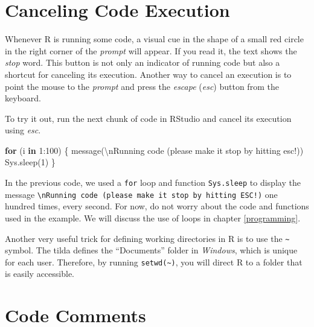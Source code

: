 \documentclass[
  12pt,
]{book}
\newenvironment{Shaded}{\begin{snugshade}}{\end{snugshade}}
\newcommand{\ControlFlowTok}[1]{\textcolor[rgb]{0.27,0.27,0.27}{\textbf{#1}}}
\newcommand{\DecValTok}[1]{\textcolor[rgb]{0.06,0.06,0.06}{#1}}
\newcommand{\FunctionTok}[1]{\textcolor[rgb]{0,0,0}{#1}}
\newcommand{\NormalTok}[1]{#1}
\newcommand{\SpecialCharTok}[1]{\textcolor[rgb]{0,0,0}{#1}}
\newcommand{\StringTok}[1]{\textcolor[rgb]{0.5,0.5,0.5}{#1}}
\newenvironment{rmdimportant}
{\begin{importantblock}
		
	} {\end{importantblock}}
\begin{document}
\hypertarget{canceling-code-execution}{%
\section{Canceling Code Execution}\label{canceling-code-execution}}

Whenever R is running some code, a visual cue in the shape of a small red circle in the right corner of the \emph{prompt} will appear. If you read it, the text shows the \emph{stop} word. This button is not only an indicator of running code but also a shortcut for canceling its execution. Another way to cancel an execution is to point the mouse to the \emph{prompt} and press the \emph{escape} (\emph{esc}) button from the keyboard.

To try it out, run the next chunk of code in RStudio and cancel its execution using \emph{esc}.

\begin{Shaded}
\begin{Highlighting}[]
\ControlFlowTok{for}\NormalTok{ (i }\ControlFlowTok{in} \DecValTok{1}\SpecialCharTok{:}\DecValTok{100}\NormalTok{) \{}
  \FunctionTok{message}\NormalTok{(}\StringTok{\textquotesingle{}}\SpecialCharTok{\textbackslash{}n}\StringTok{Running code (please make it stop by hitting esc!)\textquotesingle{}}\NormalTok{)}
  \FunctionTok{Sys.sleep}\NormalTok{(}\DecValTok{1}\NormalTok{)}
\NormalTok{\}}
\end{Highlighting}
\end{Shaded}

In the previous code, we used a \texttt{for} loop and function \texttt{Sys.sleep} to display the message \texttt{\textquotesingle{}\textbackslash{}nRunning\ code\ (please\ make\ it\ stop\ by\ hitting\ ESC!)\textquotesingle{}} one hundred times, every second. For now, do not worry about the code and functions used in the example. We will discuss the use of loops in chapter \ref{programming}.

\begin{rmdimportant}
Another very useful trick for defining working directories in R is to
use the \texttt{\textasciitilde{}} symbol. The tilda defines the
``Documents'' folder in \emph{Windows}, which is unique for each user.
Therefore, by running
\texttt{setwd(\textquotesingle{}\textasciitilde{}\textquotesingle{})},
you will direct R to a folder that is easily accessible.
\end{rmdimportant}

\hypertarget{code-comments}{%
\section{Code Comments}\label{code-comments}}
\end{document}
